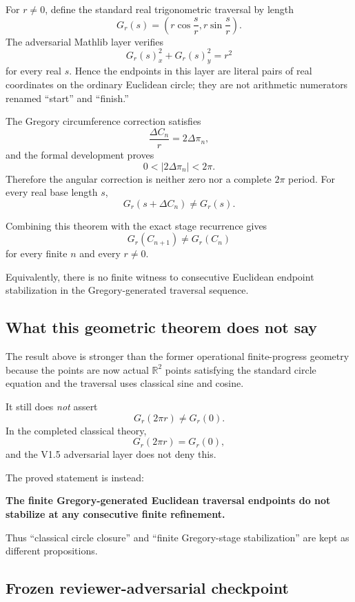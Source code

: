 \documentclass[11pt,a4paper]{article}
\begin{document}
For $r\neq0$, define the standard real trigonometric traversal by
length
\[
G_r(s)
=
\left(
r\cos\frac{s}{r},
r\sin\frac{s}{r}
\right).
\]
The adversarial Mathlib layer verifies
\[
\boxed{
G_r(s)_x^2+G_r(s)_y^2=r^2
}
\]
for every real $s$.  Hence the endpoints in this layer are literal
pairs of real coordinates on the ordinary Euclidean circle; they are
not arithmetic numerators renamed ``start'' and ``finish.''

The Gregory circumference correction satisfies
\[
\frac{\Delta C_n}{r}
=
2\Delta\pi_n,
\]
and the formal development proves
\[
0<
\left|2\Delta\pi_n\right|
<
2\pi.
\]
Therefore the angular correction is neither zero nor a complete
$2\pi$ period.  For every real base length $s$,
\[
\boxed{
G_r(s+\Delta C_n)\neq G_r(s).
}
\]

Combining this theorem with the exact stage recurrence gives
\[
\boxed{
G_r(C_{n+1})
\neq
G_r(C_n)
}
\]
for every finite $n$ and every $r\neq0$.

Equivalently, there is no finite witness to consecutive Euclidean
endpoint stabilization in the Gregory-generated traversal sequence.

\subsection{What this geometric theorem does not say}

The result above is stronger than the former operational
finite-progress geometry because the points are now actual
$\mathbb R^2$ points satisfying the standard circle equation and the
traversal uses classical sine and cosine.

It still does \emph{not} assert
\[
G_r(2\pi r)\neq G_r(0).
\]
In the completed classical theory,
\[
G_r(2\pi r)=G_r(0),
\]
and the V1.5 adversarial layer does not deny this.

The proved statement is instead:
\begin{center}
\textbf{The finite Gregory-generated Euclidean traversal endpoints do
not stabilize at any consecutive finite refinement.}
\end{center}

Thus ``classical circle closure'' and ``finite Gregory-stage
stabilization'' are kept as different propositions.

\subsection{Frozen reviewer-adversarial checkpoint}
\end{document}
